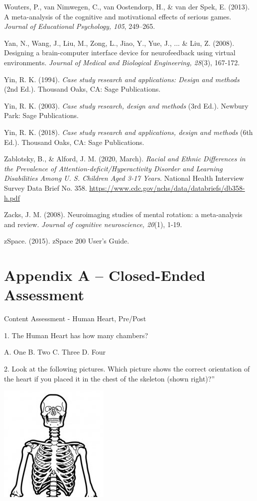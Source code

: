 \documentclass[11.5pt]{sig-alternate} %
\begin{document}
Wouters, P., van Nimwegen, C., van Oostendorp, H., \& van der Spek, E. (2013). A meta-analysis of the cognitive and motivational effects of serious games. \textit{Journal of Educational Psychology, 105}, 249–265.

Yan, N., Wang, J., Liu, M., Zong, L., Jiao, Y., Yue, J., ... \& Liu, Z. (2008). Designing a brain-computer interface device for neurofeedback using virtual environments. \textit{Journal of Medical and Biological Engineering, 28}(3), 167-172.

Yin, R. K. (1994). \textit{Case study research and applications: Design and methods} (2nd Ed.). Thousand Oaks, CA:  Sage Publications. 

Yin, R. K. (2003). \textit{Case study research, design and methods} (3rd  Ed.). Newbury Park: Sage Publications.

Yin, R. K. (2018). \textit{Case study research and applications, design and methods} (6th Ed.). Thousand Oaks, CA: Sage Publications.

Zablotsky, B., \& Alford, J. M. (2020, March). \textit{Racial and Ethnic Differences in the Prevalence of Attention-deficit/Hyperactivity Disorder and Learning Disabilities Among U. S. Children Aged 3-17 Years}. National Health Interview Survey Data Brief No. 358. \url{https://www.cdc.gov/nchs/data/databriefs/db358-h.pdf}

Zacks, J. M. (2008). Neuroimaging studies of mental rotation: a meta-analysis and review. \textit{Journal of cognitive neuroscience, 20}(1), 1-19.

zSpace. (2015). zSpace 200 User’s Guide. 

\clearpage
\onecolumn
\section*{Appendix A – Closed-Ended Assessment}
Content Assessment - Human Heart, Pre/Post

1. The Human Heart has how many chambers?

A. One B. Two C. Three D. Four

2. Look at the following pictures. Which picture shows the correct orientation of the heart if you placed it in the chest of the skeleton (shown right)?”

\includegraphics[]{quiz/skeleton.jpg}
\end{document}
